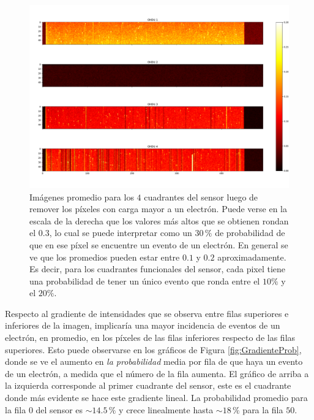 \begin{figure}[h]
    \centering
    \includegraphics[scale=0.4]{Figs/1ePromedio.pdf}
    \caption{Imágenes promedio para los $4$ cuadrantes del sensor luego de remover los píxeles con carga mayor a un electrón. Puede verse en la escala de la derecha que los valores más altos que se obtienen rondan el $0.3$, lo cual se puede interpretar como un $30\,\%$ de probabilidad de que en ese píxel se encuentre un evento de un electrón. En general se ve que los promedios pueden estar entre $0.1$ y $0.2$ aproximadamente. Es decir, para los cuadrantes funcionales del sensor, cada pixel tiene una probabilidad de tener un único evento que ronda entre el $10\%$ y el $20\%$.}
    \label{fig:Eventos1e}
\end{figure}
Respecto al gradiente de intensidades que se observa entre filas superiores e inferiores de la imagen, implicaría una mayor incidencia de eventos de un electrón, en promedio, en los píxeles de las filas inferiores respecto de las filas superiores. 
Esto puede observarse en los gráficos de Figura \ref{fig:GradienteProb}, donde se ve el aumento en \textit{la probabilidad} media por fila de que haya un evento de un electrón, a medida que el número de la fila aumenta. El gráfico de arriba a la izquierda corresponde al primer cuadrante del sensor, este es el cuadrante donde más evidente se hace este gradiente lineal. La probabilidad promedio para la fila $0$ del sensor es $\sim 14.5\,\%$ y crece linealmente hasta $\sim 18\,\%$ para la fila $50$. 
